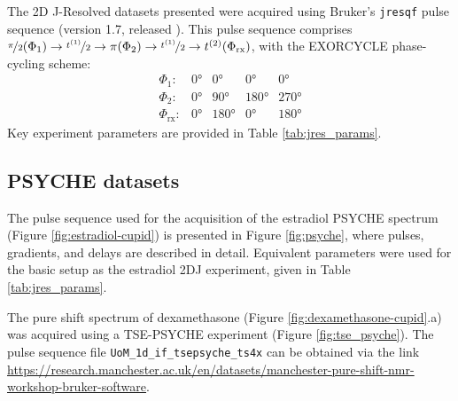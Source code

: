 The 2D J-Resolved datasets presented were acquired using Bruker's
\texttt{jresqf} pulse sequence (version 1.7, released
). This pulse sequence comprises
 $\nicefrac{\pi}{2}(\Phi_1) \rightarrow \nicefrac{t^{(1)}}{2} \rightarrow
\pi(\Phi_{2}) \rightarrow \nicefrac{t^{(1)}}{2} \rightarrow t^{(2)}(\Phi_{\text{rx}})$, with
the EXORCYCLE phase-cycling scheme\cite[Section 11.6]{Keeler2010}:
\begin{equation*}
    \begin{array}{lllll}
        \Phi_{1}: & \ang{0} & \ang{0} & \ang{0} & \ang{0} \\
        \Phi_{2}: & \ang{0} & \ang{90} & \ang{180} & \ang{270} \\
        \Phi_{\text{rx}}: & \ang{0} & \ang{180} & \ang{0} & \ang{180}
    \end{array}
\end{equation*}
Key experiment parameters are provided in Table \ref{tab:jres_params}.


\subsection{\acs{PSYCHE} datasets}
The pulse sequence used for the acquisition of the estradiol \ac{PSYCHE}
spectrum (Figure \ref{fig:estradiol-cupid}) is presented in Figure
\ref{fig:psyche}, where
pulses, gradients, and delays are described in detail. Equivalent parameters
were used for the basic setup as the estradiol 2DJ experiment, given in Table
\ref{tab:jres_params}.

The pure shift spectrum of dexamethasone (Figure
\ref{fig:dexamethasone-cupid}.a) was acquired using a \ac{TSE-PSYCHE}
experiment (Figure \ref{fig:tse_psyche}). The pulse sequence file
\texttt{UoM\_1d\_if\_tsepsyche\_ts4x} can be obtained via the link
\url{https://research.manchester.ac.uk/en/datasets/manchester-pure-shift-nmr-workshop-bruker-software}.

